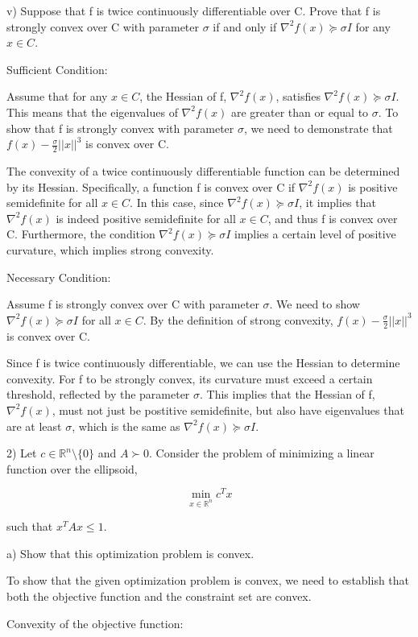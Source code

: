 \documentclass{article}
\newcommand{\RR}{\mathbb{R}}
\begin{document}
v) Suppose that f is twice continuously differentiable over C. Prove that f
is strongly convex over C with parameter $\sigma$ if and only if
$\nabla^2 f(x) \succeq \sigma I$ for any $x \in C$.


Sufficient Condition:

Assume that for any $x \in C$, the Hessian of f, $\nabla^2 f(x)$,
satisfies $\nabla^2 f(x) \succeq \sigma I$. This means that the
eigenvalues of $\nabla^2 f(x)$ are greater than or equal to $\sigma$.
To show that f is strongly convex with parameter $\sigma$,
we need to demonstrate that $f(x) - \frac{\sigma}{2}||x||^3$ is convex over C.

The convexity of a twice continuously differentiable function can be
determined by its Hessian. Specifically, a function f is convex over C
if $\nabla^2 f(x)$ is positive semidefinite for all $x \in C$.
In this case, since $\nabla^2 f(x) \succeq \sigma I$, it implies that
$\nabla^2 f(x)$ is indeed positive semidefinite for all $x \in C$,
and thus f is convex over C. Furthermore, the condition
$\nabla^2 f(x) \succeq \sigma I$ implies a certain level of positive curvature,
which implies strong convexity.


Necessary Condition:

Assume f is strongly convex over C with parameter $\sigma$. We need to show
$\nabla^2 f(x) \succeq \sigma I$ for all $x \in C$. By the definition of strong
convexity, $f(x) - \frac{\sigma}{2}||x||^3$ is convex over C.

Since f is twice continuously differentiable, we can use the Hessian
to determine convexity. For f to be strongly convex, its curvature must
exceed a certain threshold, reflected by the parameter $\sigma$.
This implies that the Hessian of f, $\nabla^2 f(x)$, must not
just be postitive semidefinite, but also have eigenvalues that are
at least $\sigma$, which is the same as $\nabla^2 f(x) \succeq \sigma I$.


2) Let $c \in \RR^n \setminus \{0\}$ and $A \succ 0$. Consider the problem
of minimizing a linear function over the ellipsoid,

\[\min_{x \in \RR^n} c^T x\]

such that $x^T A x \leq 1$.

a) Show that this optimization problem is convex.

To show that the given optimization problem is convex, we need to
establish that both the objective function and the constraint set
are convex.

Convexity of the objective function:
\end{document}
